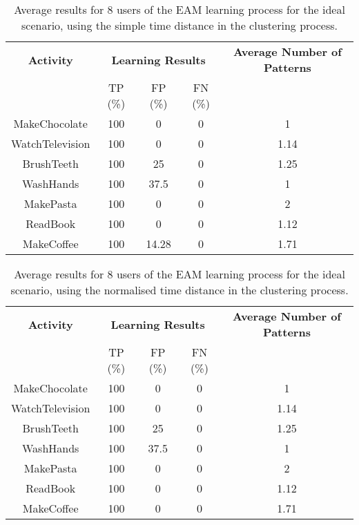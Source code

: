 \begin{table}[htbp]\scriptsize
  \begin{center}
        \begin{tabular}{ccccc}
            \hline            
            \textbf{Activity} & \multicolumn{3}{c}{\textbf{Learning Results}} & \textbf{Average Number of Patterns} \\
             & TP (\%) & FP (\%) & FN (\%) & \\             
            \hline
            MakeChocolate   & 100 & 0     & 0  & 1 \\
	    WatchTelevision & 100 & 0     & 0  & 1.14    \\
	    BrushTeeth      & 100 & 25    & 0  & 1.25 \\
	    WashHands       & 100 & 37.5    & 0  & 1 \\
	    MakePasta       & 100 & 0     & 0  & 2 \\
	    ReadBook        & 100 & 0     & 0  & 1.12  \\
	    MakeCoffee      & 100 & 14.28 & 0  & 1.71  \\
            \hline
        \end{tabular}
        \caption{Average results for 8 users of the EAM learning process for the ideal scenario, using the simple time distance in the clustering process.}
        \label{tab-rp-ideal-t0}
    \end{center}
\end{table}


\begin{table}[htbp]\scriptsize
  \begin{center}
        \begin{tabular}{ccccc}
            \hline            
            \textbf{Activity} & \multicolumn{3}{c}{\textbf{Learning Results}} & \textbf{Average Number of Patterns} \\
             & TP (\%) & FP (\%) & FN (\%) & \\             
            \hline
            MakeChocolate   & 100 & 0     & 0  & 1 \\
	    WatchTelevision & 100 & 0     & 0  & 1.14    \\
	    BrushTeeth      & 100 & 25    & 0  & 1.25 \\
	    WashHands       & 100 & 37.5    & 0  & 1 \\
	    MakePasta       & 100 & 0     & 0  & 2 \\
	    ReadBook        & 100 & 0     & 0  & 1.12  \\
	    MakeCoffee      & 100 & 0     & 0  & 1.71  \\
            \hline
        \end{tabular}
        \caption{Average results for 8 users of the EAM learning process for the ideal scenario, using the normalised time distance in the clustering process.}
        \label{tab-rp-ideal-t1}
    \end{center}
\end{table}



